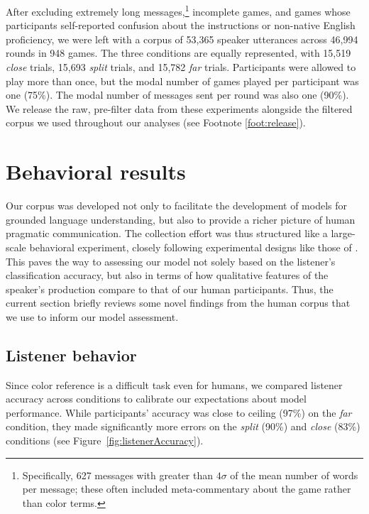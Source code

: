 \documentclass[11pt,letterpaper]{article}
\renewcommand{\|}{\mid}
\newcommand{\figref}[1]{Figure~\ref{#1}}
\newcommand{\cond}{\emph}
\begin{document}
After excluding extremely long messages,\footnote{Specifically, 627 messages with greater than $4\sigma$ of the mean number of words per message; these often included meta-commentary about the game rather than color terms.} incomplete games, and games whose participants self-reported confusion about the instructions or non-native English proficiency, we were left with a corpus of 53,365 speaker utterances across 46,994 rounds in 948 games. The three conditions are equally represented, with 15,519 \emph{close} trials, 15,693 \emph{split} trials, and 15,782 \emph{far} trials. Participants were allowed to play more than once, but the modal number of games played per participant was one (75\%). The modal number of messages sent per round was also one (90\%). We release the raw, pre-filter data from these experiments alongside the filtered corpus we used throughout our analyses (see Footnote
\ref{foot:release}).

\section{Behavioral results}

Our corpus was developed not only to facilitate the development of
models for grounded language understanding, but also to provide a
richer picture of human pragmatic communication. The collection effort
was thus structured like a large-scale behavioral experiment, closely
following experimental designs like those of
. This paves the way to assessing our
model not solely based on the listener's classification accuracy, but also in terms of how
qualitative features of the speaker's production compare to that of our human participants. 
Thus, the current section briefly reviews some novel findings from the human
corpus that we use to inform our model assessment.

\subsection{Listener behavior}

Since color reference is a difficult task even for humans, we compared listener accuracy across conditions to calibrate our expectations about model performance. While participants' accuracy was close to ceiling (97\%) on the \cond{far} condition, they made significantly more errors on the \cond{split} (90\%) and \cond{close} (83\%) conditions (see \figref{fig:listenerAccuracy}).
\end{document}
